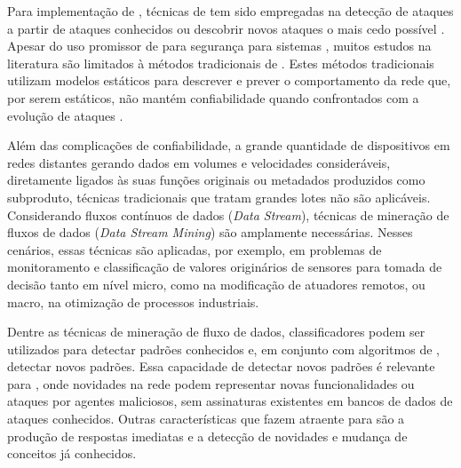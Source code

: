 Para implementação de \nids, técnicas de \ml tem sido empregadas na detecção de
ataques a partir de ataques conhecidos ou descobrir novos ataques o mais cedo
possível \cite{buczak2016survey,mitchell2014survey}.
Apesar do uso promissor de \ml para segurança para sistemas \iot, muitos estudos
na literatura \cite{buczak2016survey,mitchell2014survey,Tahsien2020} são
limitados à métodos tradicionais de \ml.
Estes métodos tradicionais utilizam modelos estáticos para descrever e prever o
comportamento da rede que, por serem estáticos, não mantém confiabilidade quando
confrontados com a evolução de ataques \cite{Viegas2019,AndreoniLopez2019}.

Além das complicações de confiabilidade, a grande quantidade de dispositivos em
redes distantes gerando dados em volumes e velocidades consideráveis,
diretamente ligados às suas funções originais ou metadados produzidos como
subproduto, técnicas tradicionais que tratam grandes lotes não são aplicáveis.
Considerando fluxos contínuos de dados (\emph{Data Stream}), técnicas de
mineração de fluxos de dados (\emph{Data Stream Mining}) são amplamente
necessárias.
% 
Nesses cenários, essas técnicas são aplicadas, por exemplo, em problemas de
monitoramento e classificação de valores originários de sensores para tomada de
decisão tanto em nível micro, como na modificação de atuadores remotos, ou
macro, na otimização de processos industriais.
% 


Dentre as técnicas de mineração de fluxo de dados, classificadores podem ser
utilizados para detectar padrões conhecidos e, em conjunto com algoritmos de
\nd, detectar novos padrões.
Essa capacidade de detectar novos padrões é relevante para \nids, onde novidades
na rede podem representar novas funcionalidades ou ataques por agentes
maliciosos, sem assinaturas existentes em bancos de dados de ataques conhecidos.
Outras características que fazem \nd atraente para \nids são a produção de
respostas imediatas e a detecção de novidades e mudança de conceitos já
conhecidos.

